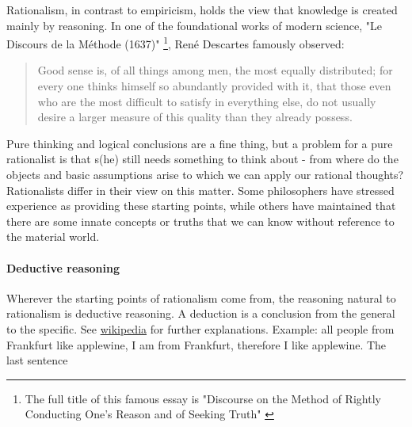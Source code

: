 \documentclass{tufte-book}
\begin{document}
Rationalism, in contrast to empiricism, holds the view that knowledge is created mainly by reasoning. In one of the foundational works of modern science, "Le Discours de la Méthode (1637)"  \footnote{The full title of this famous essay is "Discourse on the Method of Rightly Conducting One's Reason and of Seeking Truth" \citep{Descartes-DiscourseMethodRightly-1673}}, René Descartes famously observed: 

\begin{quote}
Good sense is, of all things among men, the most equally distributed; for every one thinks himself so abundantly provided with it, that those even who are the most difficult to satisfy in everything else, do not usually desire a larger measure of this quality than they already possess.
\end{quote}

Pure thinking and logical conclusions are a fine thing, but a problem for a pure rationalist is that s(he) still needs something to think  about - from where do the objects and basic assumptions arise to which we can apply our rational thoughts? Rationalists differ in their view on this matter. Some philosophers have stressed experience as providing these starting points, while others have maintained that there are some innate concepts or truths that we can know without reference to the material world. 

\paragraph{Deductive reasoning}Wherever the starting points of rationalism come from, the reasoning natural to rationalism is deductive reasoning. A deduction is a conclusion from the general to the specific. 
See \href{https://en.wikipedia.org/wiki/Syllogism}{wikipedia} for further explanations. Example: all people from Frankfurt like applewine, I am from Frankfurt, therefore I like applewine. The last sentence 
\end{document}
